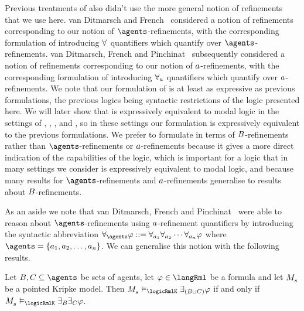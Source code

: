 Previous treatments of \logicRml{} also didn't use the more general notion of refinements that we use here.
van Ditmarsch and French~\cite{vanditmarsch:2009} considered a notion of refinements corresponding to our notion of $\agents$-refinements, with the corresponding formulation of \logicRml{} introducing $\allrefs$ quantifiers which quantify over $\agents$-refinements.
van Ditmarsch, French and Pinchinat~\cite{vanditmarsch:2010} subsequently considered a notion of refinements corresponding to our notion of $a$-refinements, with the corresponding formulation of \logicRml{} introducing ${\forall_{a}}$ quantifiers which quantify over $a$-refinements.
We note that our formulation of \logicRml{} is at least as expressive as previous formulations, the previous logics being syntactic restrictions of the logic presented here.
We will later show that \logicRml{} is expressively equivalent to modal logic in the settings of \classK{}, \classKFF{}, \classKD{}, and \classS{}, so in these settings our formulation is expressively equivalent to the previous formulations.
We prefer to formulate \logicRml{} in terms of $B$-refinements rather than $\agents$-refinements or $a$-refinements because it gives a more direct indication of the capabilities of the logic, which is important for a logic that in many settings we consider is expressively equivalent to modal logic, and because many results for $\agents$-refinements and $a$-refinements generalise to results about $B$-refinements.

As an aside we note that van Ditmarsch, French and Pinchinat~\cite{vanditmarsch:2010} were able to reason about $\agents$-refinements using $a$-refinement quantifiers by introducing the syntactic abbreviation $\allrefsAs \phi ::= \allrefs[\agentA_1] \allrefs[\agentA_2] \cdots \allrefs[\agentA_n] \phi$ where $\agents = \{\agentA_1, \agentA_2, \dots, \agentA_n\}$.
We can generalise this notion with the following results.

\begin{proposition}\label{rml-agent-decomposition}
Let $\agentsB, \agentsC \subseteq \agents$ be sets of agents, let $\phi \in \langRml$ be a formula and let $\kPModel{\kStateS}$ be a pointed Kripke model.
Then $\kPModel{\kStateS} \entails_\logicRmlK \somerefs[(\agentsB \cup \agentsC)] \phi$ if and only if $\kPModel{\kStateS} \entails_\logicRmlK \somerefsBs \somerefsCs \phi$.
\end{proposition}

